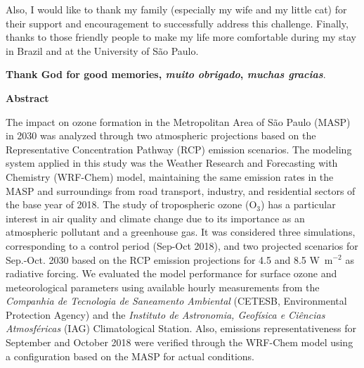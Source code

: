 \begin{spacing}{1.5}
		Also, I would like to thank my family (especially my wife and my little cat) for their support and encouragement to successfully address this challenge.
		Finally, thanks to those friendly people to make my life more comfortable during my stay in Brazil and at the University of S\~{a}o Paulo.
		
		\textbf{Thank God for good memories,		
		\textit{muito obrigado},
      	\textit{muchas gracias}}.
		
		
		\cleardoublepage
	
	\begin{center}
		\LARGE \textbf{Abstract}\\[2cm]
	\end{center}
The impact on ozone formation in the Metropolitan Area of S\~{a}o Paulo (MASP) in 2030 was analyzed through two atmospheric projections based on the Representative Concentration Pathway (RCP) emission scenarios. The modeling system applied in this study was the Weather Research and Forecasting with Chemistry (WRF-Chem) model, maintaining the same emission rates in the MASP and surroundings from road transport, industry, and residential sectors of the base year of 2018.
The study of tropospheric ozone (O$_3$) has a particular interest in air quality and climate change due to its importance as an atmospheric pollutant and a greenhouse gas.
It was considered three simulations, corresponding to a control period (Sep-Oct 2018), and two projected scenarios for Sep.-Oct. 2030 based on the RCP emission projections for 4.5 and 8.5 W~m$^{-2}$ as radiative forcing.
We evaluated the model performance for surface ozone and meteorological parameters using available hourly measurements from the \textit{Companhia de Tecnologia de Saneamento Ambiental} (CETESB, Environmental Protection Agency) and the \textit{Instituto de Astronomia, Geof\'{i}sica e Ci\^{e}ncias Atmosf\'{e}ricas} (IAG) Climatological Station. Also, emissions representativeness for September and October 2018 were verified through the WRF-Chem model using a configuration based on the MASP for actual conditions.

\end{spacing}
